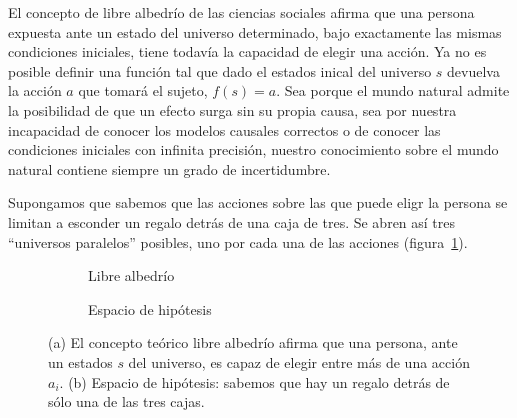 \documentclass[a4paper,10pt]{book}
\theoremstyle{definition}
\begin{document}

El concepto de libre albedr\'io de las ciencias sociales afirma que una persona expuesta ante un estado del universo determinado, bajo exactamente las mismas condiciones iniciales, tiene todav\'ia la capacidad de elegir una acci\'on.
%
Ya no es posible definir una funci\'on tal que dado el estados inical del universo $s$ devuelva la acci\'on $a$ que tomar\'a el sujeto, $f(s) = a$.
%
Sea porque el mundo natural admite la posibilidad de que un efecto surga sin su propia causa, sea por nuestra incapacidad de conocer los modelos causales correctos o de conocer las condiciones iniciales con infinita precisi\'on, nuestro conocimiento sobre el mundo natural contiene siempre un grado de incertidumbre.


Supongamos que sabemos que las acciones sobre las que puede eligr la persona se limitan a esconder un regalo detr\'as de una caja de tres.
%
Se abren as\'i tres ``universos paralelos'' posibles, uno por cada una de las acciones (figura~\ref{fig:libre_albedrio}).
%
\begin{figure}[ht!]
\centering
\begin{subfigure}[b]{0.48\textwidth}
\centering
    \caption{Libre albedr\'io}
    \label{fig:libre_albedrio}
\end{subfigure}
\begin{subfigure}[b]{0.48\textwidth}
 \centering
   \caption{Espacio de hip\'otesis}
   \label{fig:espacio_de_hipotesis}
\end{subfigure}
    \caption{(a) El concepto te\'orico libre albedr\'io afirma que una persona, ante un estados $s$ del universo, es capaz de elegir entre m\'as de una acci\'on $a_i$.
    (b) Espacio de hip\'otesis: sabemos que hay un regalo detr\'as de s\'olo una de las tres cajas. }
\end{figure}
\end{document}
